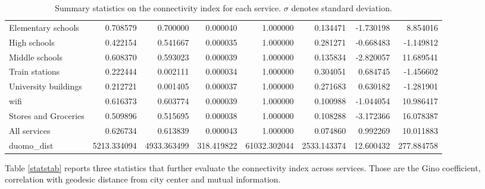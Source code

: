 \documentclass[11pt, titlepage]{article}
\begin{document}
\begin{landscape}
\begin{table}
\begin{tabular}{lrrrrrrr}
			   Elementary schools &    0.708579 &    0.700000 &   0.000040 &     1.000000 &    0.134471 & -1.730198 &   8.854016 \\
					 High schools &    0.422154 &    0.541667 &   0.000035 &     1.000000 &    0.281271 & -0.668483 &  -1.149812 \\
				   Middle schools &    0.608370 &    0.593023 &   0.000039 &     1.000000 &    0.135834 & -2.820057 &  11.689541 \\
				   Train stations &    0.222444 &    0.002111 &   0.000034 &     1.000000 &    0.304051 &  0.684745 &  -1.456602 \\
			 University buildings &    0.212721 &    0.001405 &   0.000037 &     1.000000 &    0.271683 &  0.630182 &  -1.281901 \\
							 wifi &    0.616373 &    0.603774 &   0.000039 &     1.000000 &    0.100988 & -1.044054 &  10.986417 \\
			 Stores and Groceries &    0.509896 &    0.515695 &   0.000038 &     1.000000 &    0.108288 & -3.172366 &  16.078387 \\
					 All services &    0.626734 &    0.613839 &   0.000043 &     1.000000 &    0.074860 &  0.992269 &  10.011883 \\
					   duomo\_dist & 5213.334094 & 4933.363499 & 318.419822 & 61032.302044 & 2533.143374 & 12.600432 & 277.884758 \\
			\bottomrule
			\end{tabular}
			
			
			\label{suumstatstab}
			\caption{Summary statistics on the connectivity index for each service. $\sigma$ denotes standard deviation.}
		\end{table}	
		\end{landscape}

Table \ref{statstab} reports three statistics that further   evaluate the connectivity index across services. Those are the Gino coefficient, correlation with geodesic distance from city center and mutual information. 
\end{document}
